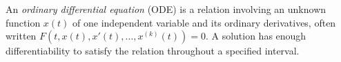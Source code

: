 
An \emph{ordinary differential equation} (ODE) is a relation involving an unknown function $x(t)$ of one independent variable and its ordinary derivatives, often written $F(t,x(t),x'(t),\ldots,x^{(k)}(t))=0$. A solution has enough differentiability to satisfy the relation throughout a specified interval.
